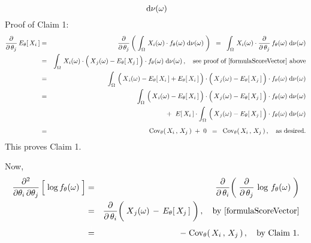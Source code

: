 \begin{enumerate}
\begin{equation*}
		\;\textnormal{d}\nu(\omega)
	\end{equation*}
	Proof of Claim 1:\quad
	\begin{eqnarray*}
	\dfrac{\partial}{\partial\,\theta_{j}}\,E_{\theta}\!\left[\,X_{i}\,\right]
	& = &
		\dfrac{\partial}{\partial\,\theta_{j}}
		\left(\;
			\int_{\Omega}\,
			X_{i}(\omega) \cdot f_{\theta}(\omega)
			\;\d\nu(\omega)
		\;\right)
	\;\; = \;\;
		\int_{\Omega}\,
			X_{i}(\omega) \cdot
			\dfrac{\partial}{\partial\,\theta_{j}}\,f_{\theta}(\omega)
		\;\d\nu(\omega)
	\\
	& = &
		\int_{\Omega}\,
			X_{i}(\omega) \cdot
			\left(\,\overset{{\color{white}.}}{X}_{j}(\omega) - E_{\theta}\!\left[\,X_{j}\,\right]\,\right)
			\cdot
			f_{\theta}(\omega)
		\;\d\nu(\omega)\,,
		\quad
		\textnormal{see proof of \eqref{formulaScoreVector} above}
	\\
	& = &
		\int_{\Omega}\,
			\left(\,\overset{{\color{white}.}}{X}_{i}(\omega) - E_{\theta}\!\left[\,X_{i}\,\right] + E_{\theta}\!\left[\,X_{i}\,\right]\,\right)
			\cdot
			\left(\,\overset{{\color{white}.}}{X}_{j}(\omega) - E_{\theta}\!\left[\,X_{j}\,\right]\,\right)
			\cdot
			f_{\theta}(\omega)
		\;\d\nu(\omega)
	\\
	& = &
		{\color{white}+}\;
		\int_{\Omega}\,
			\left(\,\overset{{\color{white}.}}{X}_{i}(\omega) - E_{\theta}\!\left[\,X_{i}\,\right]\,\right)
			\cdot
			\left(\,\overset{{\color{white}.}}{X}_{j}(\omega) - E_{\theta}\!\left[\,X_{j}\,\right]\,\right)
			\cdot
			f_{\theta}(\omega)
		\;\d\nu(\omega)
	\\
	&&
		+\;\;
		E\!\left[\,X_{i}\,\right]
		\cdot
		\int_{\Omega}\,
			\left(\,\overset{{\color{white}.}}{X}_{j}(\omega) - E_{\theta}\!\left[\,X_{j}\,\right]\,\right)
			\cdot
			f_{\theta}(\omega)
		\;\d\nu(\omega)
	\\
	& \overset{{\color{white}\vert}}{=} &
		\Cov_{\theta}\!\left(\,X_{i}\,,\,X_{j}\,\right) \; + \; 0
	\;\; = \;\;
		\Cov_{\theta}\!\left(\,X_{i}\,,\,X_{j}\,\right),
		\quad
		\textnormal{as desired}.
	\end{eqnarray*}
	This proves Claim 1.
	
	\vskip 0.5cm
	\noindent
	Now,
	\begin{eqnarray*}
	\dfrac{\partial^{2}}{\partial\theta_{i}\,\partial\theta_{j}} \left[\;\overset{{\color{white}.}}{\log} \, f_{\theta}(\omega)\;\right]
	&=&
		\dfrac{\partial}{\partial\,\theta_{i}}\!
		\left(\;
			\dfrac{\partial}{\partial\,\theta_{j}}\, \log \, f_{\theta}(\omega)
		\;\right)
	\\
	&=&
		\dfrac{\partial}{\partial\,\theta_{i}}\!
		\left(\;
			\overset{{\color{white}-}}{X}_{j}(\omega) \, - \, E_{\theta}\!\left[\,X_{j}\,\right]
		\;\right),
		\quad
		\textnormal{by \eqref{formulaScoreVector}}
	\\
	&\overset{{\color{white}\vert}}{=}&
		-\; \Cov_{\theta}\!\left(\,X_{i}\,,\,X_{j}\,\right),
		\quad
		\textnormal{by Claim 1}.
	\end{eqnarray*}
	

\end{enumerate}
